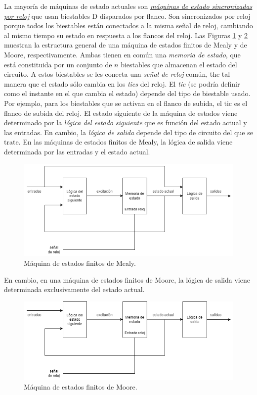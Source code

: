 La mayoría de máquinas de estado actuales son \hyperlink{clocked_synchronous_state_machine}{\emph{máquinas de estado sincronizadas por reloj}} que usan biestables D disparados por flanco. Son sincronizados por reloj porque todos los biestables están conectados a la misma señal de reloj, cambiando al mismo tiempo su estado en respuesta a los flancos del reloj. Las Figuras \ref{fig:mef-mealy} y \ref{fig:mef-moore} muestran la estructura general de una máquina de estados finitos de Mealy y de Moore, respectivamente. Ambas tienen en común una \emph{memoria de estado}, que está constituida por un conjunto de $n$ biestables que almacenan el estado del circuito. A estos biestables se les conecta una \emph{señal de reloj} común, the tal manera que el estado sólo cambia en los \emph{tics} del reloj. El \emph{tic} (se podría definir como el instante en el que cambia el estado) depende del tipo de biestable usado. Por ejemplo, para los biestables que se activan en el flanco de subida, el tic es el flanco de subida del reloj. El estado siguiente de la máquina de estados viene determinado por la \emph{lógica del estado siguiente} que es función del estado actual y las entradas. En cambio, la \emph{lógica de salida} depende del tipo de circuito del que se trate. En las máquinas de estados finitos de Mealy, la lógica de salida viene determinada por las entradas y el estado actual.

\begin{figure}[h]
    \centering
    \includegraphics[width=\textwidth]{figs/mef-mealy.drawio.png}
    \caption[short]{Máquina de estados finitos de Mealy.}
    \label{fig:mef-mealy}
\end{figure}

En cambio, en una máquina de estados finitos de Moore, la lógica de salida viene determinada exclusivamente del estado actual.

\begin{figure}[h]
    \centering
    \includegraphics[width=\textwidth]{figs/mef-moore.drawio.png}
    \caption[short]{Máquina de estados finitos de Moore.}
    \label{fig:mef-moore}
\end{figure}

